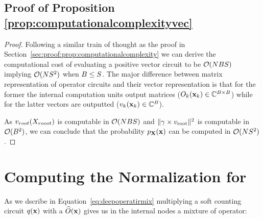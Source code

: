 \subsection{Proof of Proposition \ref{prop:computationalcomplexityvec}}
\label{sec:proof:prop:computationalcomplexityvec}


\propcomputationalcomplexityvec*

\begin{proof}
	Following a similar train of thought as the proof in Section~\ref{sec:proof:prop:computationalcomplexity} we can derive the computational cost of evaluating a positive vector circuit to be $\mathcal{O} (N B S)$ implying
	$\mathcal{O} (N  S^2)$
	when $B \leq S$.
	The major difference between matrix representation of operator circuits and their vector representation is that for the former the internal computation units output matrices ($O_k(\mathbf{x}_k)\in \mathbb{C}^{B \times B}$) while for the latter vectors are outputted ($v_k(\mathbf{x}_k)\in \mathbb{C}^{B}$).



	As $v_{root}(X_{rooot})$ is computable in $\mathcal{O} (N B S)$ and $\lVert \gamma \times v_{\text{root}}\rVert^2$ is computable in $\mathcal{O}(B^2)$, we can conclude that the probability $p_{\mathbf{X}}(\mathbf{x})$ can be computed in $\mathcal{O} (N S^2)$.
\end{proof}





\section{Computing the Normalization for \noisepuncs}
\label{sec:noisepuncnormalization}




As we dscribe in Equation~\ref{eq:deepoperatirmix} multiplying a soft counting circuit $q(\mathbf{x})$ with a \punc $\widehat{O}(\mathbf{x})$ gives us in the internal nodes a mixture of operator:

